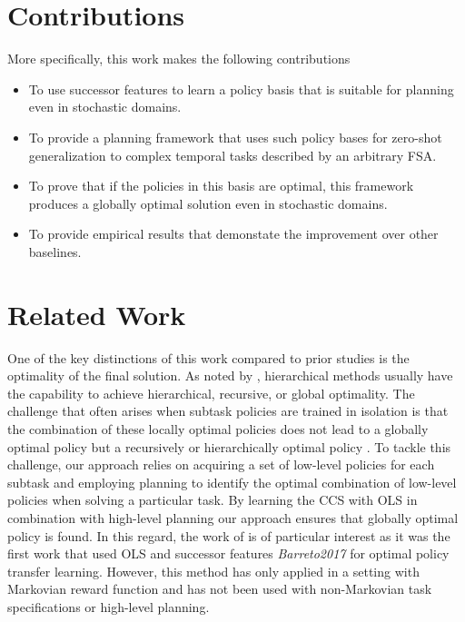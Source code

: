 \section{Contributions}

More specifically, this work makes the following contributions

 \begin{itemize}
    \item To use successor features to learn a policy basis that is suitable for planning even in stochastic domains.
    \item To provide a planning framework that uses such policy bases for zero-shot generalization to complex temporal tasks described by an arbitrary FSA.
    \item To prove that if the policies in this basis are optimal, this framework produces a globally optimal solution even in stochastic domains.
    \item To provide empirical results that demonstate the improvement over other baselines.
\end{itemize}


\section{Related Work}
One of the key distinctions of this work compared to prior studies is the optimality of the final solution. As noted by \citep{Dietterich2000}, hierarchical methods usually have the capability to achieve hierarchical, recursive, or global optimality. The challenge that often arises when subtask policies are trained in isolation is that the combination of these locally optimal policies does not lead to a globally optimal policy but a recursively \citep{Dayan1992} or hierarchically optimal policy \citep{Sutton1999, Mann2015, Araki2021}.  To tackle this challenge, our approach relies on acquiring a set of low-level policies for each subtask and employing planning to identify the optimal combination of low-level policies when solving a particular task. By learning the CCS with OLS \citep{Roijers2014} in combination with high-level planning our approach ensures that globally optimal policy is found. In this regard, the work of \citep{Alegre2022} is of particular interest as it was the first work that used OLS and successor features \textit{Barreto2017} for optimal policy transfer learning. However, this method has only applied in a setting with Markovian reward function and has not been used with non-Markovian task specifications or high-level planning. 

